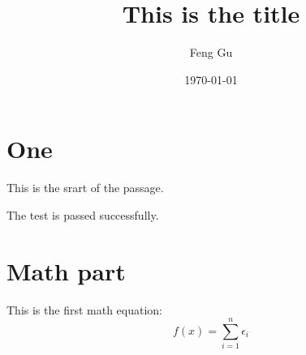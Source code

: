 \documentclass{article}
\title{This is the title}
\author{Feng Gu}
\date{\today}
\begin{document}
\maketitle


\section{One}
This is the srart of the passage.


The test is passed successfully.


\section{Math part}

This is the first math equation:
\[
f(x) = \sum_{i=1}^{n} \epsilon_i
\]
\end{document}
